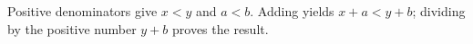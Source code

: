Positive denominators give $x<y$ and $a<b$. Adding yields $x+a<y+b$; dividing by the positive number $y+b$ proves the result.
